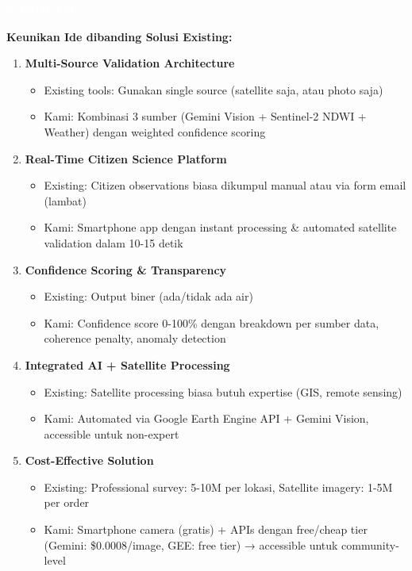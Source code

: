 \documentclass[12pt,a4paper]{article}
\newcommand{\sectionbox}[1]{%
  \colorbox{samsungblue}{%
    \parbox{\textwidth}{%
      \textcolor{white}{\large\bfseries #1}%
    }%
  }%
}
\newcommand{\subsectionbox}[1]{%
  \textbf{\large #1}\\[0.3cm]
}
\begin{document}
\vspace{1cm}

\sectionbox{7. INOVASI}

\vspace{0.5cm}

\subsectionbox{Keunikan Ide dibanding Solusi Existing:}

\begin{enumerate}
  \item \textbf{Multi-Source Validation Architecture}
  \begin{itemize}
    \item Existing tools: Gunakan single source (satellite saja, atau photo saja)
    \item Kami: Kombinasi 3 sumber (Gemini Vision + Sentinel-2 NDWI + Weather) dengan weighted confidence scoring
  \end{itemize}

  \item \textbf{Real-Time Citizen Science Platform}
  \begin{itemize}
    \item Existing: Citizen observations biasa dikumpul manual atau via form email (lambat)
    \item Kami: Smartphone app dengan instant processing \& automated satellite validation dalam 10-15 detik
  \end{itemize}

  \item \textbf{Confidence Scoring \& Transparency}
  \begin{itemize}
    \item Existing: Output biner (ada/tidak ada air)
    \item Kami: Confidence score 0-100\% dengan breakdown per sumber data, coherence penalty, anomaly detection
  \end{itemize}

  \item \textbf{Integrated AI + Satellite Processing}
  \begin{itemize}
    \item Existing: Satellite processing biasa butuh expertise (GIS, remote sensing)
    \item Kami: Automated via Google Earth Engine API + Gemini Vision, accessible untuk non-expert
  \end{itemize}

  \item \textbf{Cost-Effective Solution}
  \begin{itemize}
    \item Existing: Professional survey: 5-10M per lokasi, Satellite imagery: 1-5M per order
    \item Kami: Smartphone camera (gratis) + APIs dengan free/cheap tier (Gemini: \$0.0008/image, GEE: free tier) → accessible untuk community-level
  \end{itemize}
\end{enumerate}
\end{document}
